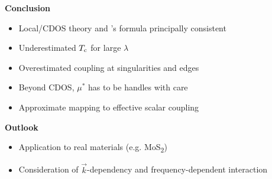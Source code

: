 \documentclass[10pt]{beamer}
\def\cmark{\ding{51}}
\def\xmark{\ding{55}}
\begin{document}
    \begin{frame}[label=conclusion]
        \begin{center}
            \color{titleblue} \bf \Large
            Conclusion
        \end{center}

        \begin{itemize}
            \item[\cmark] Local/CDOS  theory and
                          's formula principally consistent
            \medskip
            \item[\xmark] Underestimated $T \sb{\text{c}}$ for large $\lambda$
            \item[\xmark] Overestimated coupling at 
                          singularities and edges
            \item[\xmark] Beyond CDOS, $\mu^*$ has to be handles with care
            \medskip
            \item         Approximate mapping to effective scalar coupling
        \end{itemize}

        \medskip

        \begin{center}
            \color{titleblue} \bf \Large
            Outlook
        \end{center}

        \begin{itemize}
            \item Application to real materials (e.g. MoS\textsubscript2)
            \item Consideration of $\vec k$-dependency and frequency-dependent
                   interaction
        \end{itemize}
    \end{frame}
\end{document}
